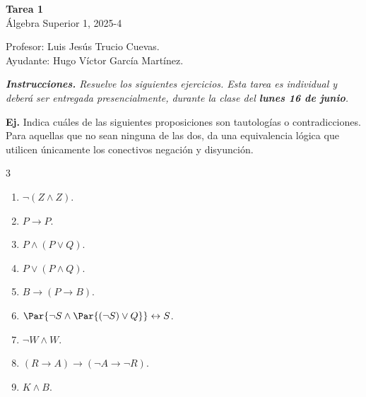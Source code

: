 \documentclass[letterpaper,DIV=14,headsepline,12pt]{scrartcl}
\newcounter{Ejer}
\newcommand{\pts}{}
\newenvironment{ejercicio}[1]{\noindent
    \ifthenelse{\equal{#1}{1}}{\renewcommand{\pts}{\textbf{(#1 pt)}}}{\renewcommand{\pts}{\textbf{(#1 pts)}}}\textbf{Ej. \theEjer} \pts\stepcounter{Ejer}}{\vspace{.3cm}}
\begin{document}
    \begin{center}
        {\fontsize{30}{60}\rmfamily \textbf{Tarea 1}} \\ \vspace{.2cm}
        Álgebra Superior 1, 2025-4
    \end{center}
    \begin{flushright}
        \footnotesize \hfill Profesor: Luis Jesús Trucio Cuevas.\\
        \hfill Ayudante: Hugo Víctor García Martínez.
    \end{flushright}

    \noindent\textit{\textbf{Instrucciones.} Resuelve los siguientes ejercicios. Esta tarea es individual y deberá ser entregada presencialmente, durante la clase del \textbf{lunes 16 de junio}.}\vspace{.4cm}

    \begin{ejercicio}{1}
        Indica cuáles de las siguientes proposiciones son tautologías o contradicciones. Para aquellas que no sean ninguna de las dos, da una equivalencia lógica que utilicen únicamente los conectivos negación y disyunción.
        \begin{multicols}{3}
            \begin{enumerate}
                \item $\lnot (Z \land Z)$.
                \item $P \to P$.
                \item $P \land (P \lor Q)$.
                \item $P \lor (P \land Q)$.
                \item $B \to (P \to B)$.
                \item $\Par{\lnot S \land \Par{(\lnot S) \lor Q}} \leftrightarrow S$.
                \item $\lnot W \land W$.
                \item $(R \to A) \to (\lnot A \to \lnot R)$.
                \item $K \land B$.
            \end{enumerate}
        \end{multicols}
    \end{ejercicio}
\end{document}
